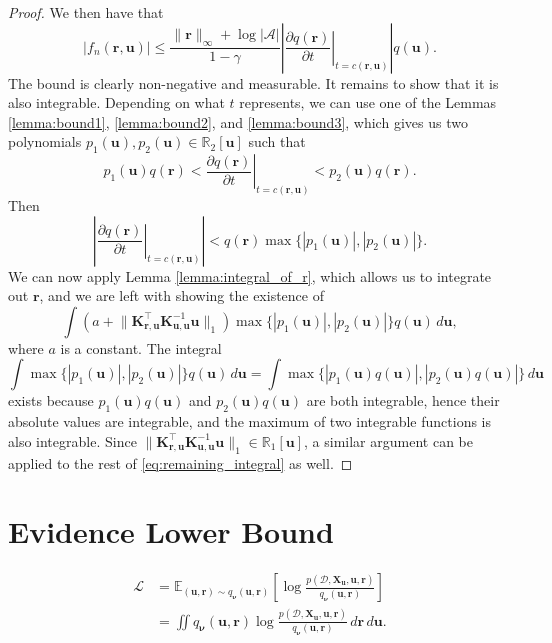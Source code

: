 \documentclass{article}
\theoremstyle{definition}
\theoremstyle{remark}
\newcommand{\Eq}{\mathbb{E}_{(\mathbf{u}, \mathbf{r}) \sim \approximation}}
\newcommand{\pfull}{p(\mathcal{D}, \mathbf{X_u}, \mathbf{u}, \mathbf{r})}
\newcommand{\approximation}{q_{\bm\nu}(\mathbf{u}, \mathbf{r})}
\newcommand{\Kuu}{\mathbf{K}_{\mathbf{u},\mathbf{u}}}
\newcommand{\Kru}{\mathbf{K}_{\mathbf{r},\mathbf{u}}}
\newcommand{\fn}{f_n(\mathbf{r}, \mathbf{u})}
\newcommand{\dx}{\,d\mathbf{r}\,d\mathbf{u}}
\newcommand{\rinf}{\lVert \mathbf{r} \rVert_\infty}
\newcommand{\vbound}{\frac{\rinf + \log|\mathcal{A}|}{1 - \gamma}}
\begin{document}
\begin{proof}
  We then have that
  \[
    |\fn| \le \vbound \left| \left. \frac{\partial
          q(\mathbf{r})}{\partial t} \right|_{t=c(\mathbf{r}, \mathbf{u})}
    \right| q(\mathbf{u}).
  \]
  The bound is clearly non-negative and measurable. It remains to show that it
  is also integrable. Depending on what $t$ represents, we can use one of the
  Lemmas \ref{lemma:bound1}, \ref{lemma:bound2}, and \ref{lemma:bound3}, which
  gives us two polynomials $p_1(\mathbf{u}), p_2(\mathbf{u}) \in
  \mathbb{R}_2[\mathbf{u}]$ such that
  \[
    p_1(\mathbf{u})q(\mathbf{r}) < \left. \frac{\partial q(\mathbf{r})}{\partial
        t} \right|_{t=c(\mathbf{r}, \mathbf{u})} < p_2(\mathbf{u})q(\mathbf{r}).
  \]
  Then
  \[
    \left| \left. \frac{\partial q(\mathbf{r})}{\partial t}
      \right|_{t=c(\mathbf{r}, \mathbf{u})} \right| < q(\mathbf{r}) \max \{
    |p_1(\mathbf{u})|, |p_2(\mathbf{u})| \}.
  \]
  We can now apply Lemma \ref{lemma:integral_of_r}, which allows us to integrate
  out $\mathbf{r}$, and we are left with showing the existence of
  \begin{equation} \label{eq:remaining_integral}
    \int \left( a + \lVert \Kru^\intercal \Kuu^{-1} \mathbf{u} \rVert_1 \right) \max \{|p_1(\mathbf{u})|, |p_2(\mathbf{u})| \} q(\mathbf{u})\,d\mathbf{u},
  \end{equation}
  where $a$ is a constant. The integral
  \[
    \int \max \{|p_1(\mathbf{u})|, |p_2(\mathbf{u})| \}
    q(\mathbf{u})\,d\mathbf{u} = \int \max \{|p_1(\mathbf{u})q(\mathbf{u})|,
    |p_2(\mathbf{u})q(\mathbf{u})| \}\,d\mathbf{u}
  \]
  exists because $p_1(\mathbf{u})q(\mathbf{u})$ and
  $p_2(\mathbf{u})q(\mathbf{u})$ are both integrable, hence their absolute
  values are integrable, and the maximum of two integrable functions is also
  integrable. Since $\lVert \Kru^\intercal \Kuu^{-1} \mathbf{u} \rVert_1 \in
  \mathbb{R}_1[\mathbf{u}]$, a similar argument can be applied to the rest of
  \eqref{eq:remaining_integral} as well.
\end{proof}

\section{Evidence Lower Bound}

\begin{equation} \label{eq:elbo}
  \begin{split}
    \mathcal{L} &= \Eq \left[ \log \frac{\pfull}{\approximation}
    \right] \\
    &= \iint \approximation \log
    \frac{\pfull}{\approximation}\dx.
  \end{split}
\end{equation}
\end{document}
